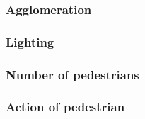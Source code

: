 \documentclass{article}
\begin{document}


\subsubsection{Agglomeration}

\subsubsection{Lighting}





\subsubsection{Number of pedestrians}

\subsubsection{Action of pedestrian}


\end{document}

